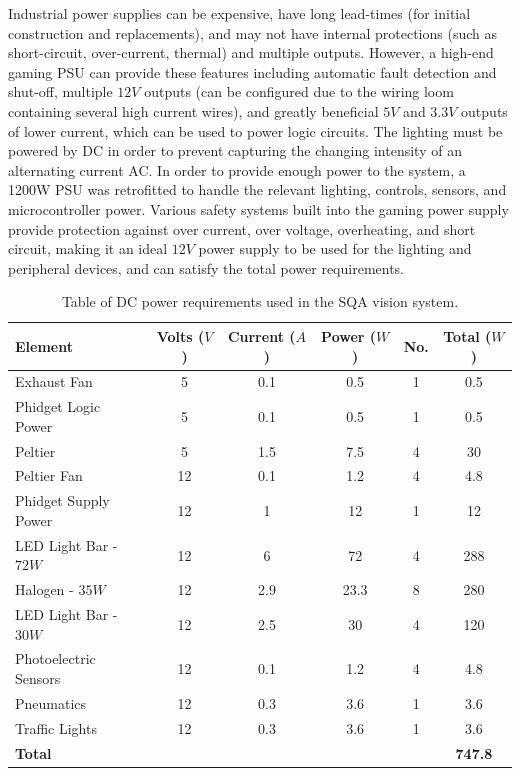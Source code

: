 \documentclass[fleqn,twoside,12pt]{report}
\begin{document}
Industrial power supplies can be expensive, have long lead-times (for initial construction and replacements), and may not have internal protections (such as short-circuit, over-current, thermal) and multiple outputs. However, a high-end gaming PSU can provide these features including automatic fault detection and shut-off, multiple $12V$ outputs (can be configured due to the wiring loom containing several high current wires), and greatly beneficial $5V$ and $3.3V$ outputs of lower current, which can be used to power logic circuits. The lighting must be powered by DC in order to prevent capturing the changing intensity of an alternating current AC. In order to provide enough power to the system, a 1200W PSU was retrofitted to handle the relevant lighting, controls, sensors, and microcontroller power. Various safety systems built into the gaming power supply provide protection against over current, over voltage, overheating, and short circuit, making it an ideal $12V$ power supply to be used for the lighting and peripheral devices, and can satisfy the total power requirements.

\begin{table}[h]
	\centering
	\caption{Table of DC power requirements used in the SQA vision system.}
	\label{tab:DC_power_table}
	\begin{tabular}{lccccc}
		
		\toprule
		\textbf{Element} & \textbf{Volts ($V$)} & \textbf{Current ($A$)} & \textbf{Power ($W$)} & \textbf{No.} & \textbf{Total ($W$)}\\[8pt]
		\midrule
		
		Exhaust Fan & 5 & 0.1 & 0.5 & 1 & 0.5 \\[4pt]
		\midrule
		Phidget Logic Power  & 5 & 0.1 & 0.5 & 1 & 0.5 \\[4pt]
		\midrule
		Peltier & 5 & 1.5 & 7.5 & 4 & 30 \\[4pt]
		\midrule
		Peltier Fan & 12 & 0.1 & 1.2 & 4 & 4.8 \\[4pt]
		\midrule
		Phidget Supply Power & 12 & 1 & 12 & 1 & 12 \\[4pt]
		\midrule
		LED Light Bar - $72W$ & 12 & 6 & 72 & 4 & 288 \\[4pt]
		\midrule
		Halogen - $35W$ & 12 & 2.9 & 23.3 & 8 & 280 \\[4pt]
		\midrule
		LED Light Bar - $30W$ & 12 & 2.5 & 30 & 4 & 120 \\[4pt]
		\midrule
		Photoelectric Sensors & 12 & 0.1 & 1.2 & 4 & 4.8 \\[4pt]
		\midrule
		Pneumatics & 12 & 0.3 & 3.6 & 1 & 3.6 \\[4pt]
		\midrule
		Traffic Lights & 12 & 0.3 & 3.6 & 1 & 3.6 \\[4pt]
		
		\midrule\midrule
		\textbf{Total } &  &  &  &  & \textbf{747.8}\\[8pt]
		\bottomrule
		
	\end{tabular}
\end{table}
\end{document}
